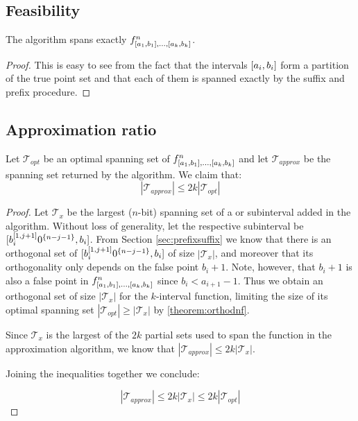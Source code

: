 
\subsection{Feasibility}
\begin{theorem}
The algorithm spans exactly
$f^n_{[a_1, b_1], \ldots, [a_k, b_k]}$.
\end{theorem}

\begin{proof}
This is easy to see from the fact that the intervals
$[a_i, b_i]$
form a partition of the true point set
and that each of them is spanned exactly
by the suffix and prefix procedure.
\end{proof}

\subsection{Approximation ratio}
\begin{theorem}
\label{theorem:2kapproxratio}
Let $\mathcal{T}_{opt}$ be an optimal spanning set of
$f^n_{[a_1, b_1], \ldots, [a_k, b_k]}$
and let $\mathcal{T}_{approx}$ be the spanning set returned
by the algorithm.
We claim that:
\begin{equation*}
|\mathcal{T}_{approx}| \leq 2k |\mathcal{T}_{opt}|
\end{equation*}
\end{theorem}

\begin{proof}
Let $\mathcal{T}_x$ be the largest ($n$-bit) spanning set
of a  or  subinterval
added in the algorithm.
Without loss of generality,
let the respective subinterval be 
$[b_i^{[1, j+1]} 0^{\{n-j-1\}}, b_i]$.
From Section \ref{sec:prefixsuffix} we know that
there is an orthogonal set of
$[b_i^{[1, j+1]} 0^{\{n-j-1\}}, b_i]$
of size $|\mathcal{T}_x|$,
and moreover that its orthogonality only depends
on the false point $b_i + 1$.
Note, however, that $b_i + 1$ is also a false point in
$f^n_{[a_1, b_1], \ldots, [a_k, b_k]}$
since $b_i < a_{i+1} - 1$.
Thus we obtain an orthogonal set of size $|\mathcal{T}_x|$
for the $k$-interval function,
limiting the size of its optimal spanning set
$|\mathcal{T}_{opt}| \geq |\mathcal{T}_x|$
by \autoref{theorem:orthodnf}.

Since $\mathcal{T}_x$ is the largest
of the $2k$ partial sets used to span the function
in the approximation algorithm,
we know that
$|\mathcal{T}_{approx}| \leq 2k |\mathcal{T}_x|$.

Joining the inequalities together we conclude:

\begin{equation*}
|\mathcal{T}_{approx}| \leq 2k |\mathcal{T}_x| \leq
2k |\mathcal{T}_{opt}|
\end{equation*}
\end{proof}

